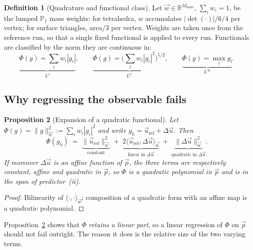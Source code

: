 \documentclass[11pt,a4paper]{article}
\newcommand{\Real}{\mathbb{R}}
\theoremstyle{plain}
\newtheorem{proposition}{Proposition}
\theoremstyle{definition}
\newtheorem{definition}[proposition]{Definition}
\theoremstyle{remark}
\begin{document}
\begin{definition}[Quadrature and functional class]
\label{def:quadrature}
Let $\vec{w}\in\Real^{M_{\mathrm{node}}}$, $\sum_i w_i = 1$, be the lumped
$\mathbb{P}_1$ mass weights: for tetrahedra, $w$ accumulates
$|\det(\cdot)|/6/4$ per vertex; for surface triangles, area$/3$ per vertex.
Weights are taken once from the reference run, so that a single fixed functional
is applied to every run. Functionals are classified by the norm they are
continuous in:
\begin{equation}
\label{eq:classes}
\underbrace{\Phi(g)=\textstyle\sum_i w_i|g_i|}_{L^1},
\qquad
\underbrace{\Phi(g)=\bigl(\textstyle\sum_i w_i|g_i|^2\bigr)^{1/2}}_{L^2},
\qquad
\underbrace{\Phi(g)=\max_i g_i}_{L^\infty}.
\end{equation}
\end{definition}

\subsection{Why regressing the observable fails}
\label{sec:why-fails}

\begin{proposition}[Expansion of a quadratic functional]
\label{prop:expansion}
Let $\Phi(g) = \|g\|_{\vec{w}}^2 := \sum_i w_i |g_i|^2$ and write
$g_h = \vec{u}_{\mathrm{ref}} + \Delta\vec{u}$. Then
\begin{equation}
\label{eq:expansion}
\Phi(g_h) \;=\;
\underbrace{\|\vec{u}_{\mathrm{ref}}\|_{\vec{w}}^2}_{\text{constant}}
\;+\;
\underbrace{2\langle \vec{u}_{\mathrm{ref}},\Delta\vec{u}\rangle_{\vec{w}}}_{\text{linear in }\Delta\vec u}
\;+\;
\underbrace{\|\Delta\vec{u}\|_{\vec{w}}^2}_{\text{quadratic in }\Delta\vec u}.
\end{equation}
If moreover $\Delta\vec{u}$ is an affine function of $\vec{p}$, the three terms
are respectively constant, affine and quadratic in $\vec{p}$, so $\Phi$ is a
quadratic polynomial in $\vec{p}$ and is in the span of predictor~(ii).
\end{proposition}

\begin{proof}
Bilinearity of $\langle\cdot,\cdot\rangle_{\vec{w}}$; composition of a quadratic
form with an affine map is a quadratic polynomial.
\end{proof}

Proposition~\ref{prop:expansion} shows that $\Phi$ \emph{retains a linear part},
so a linear regression of $\Phi$ on $\vec{p}$ should not fail outright. The
reason it does is the relative size of the two varying terms.
\end{document}
